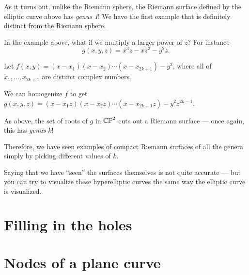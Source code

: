 As it turns out, unlike the Riemann sphere, the Riemann surface defined by the elliptic curve above
has \emph{genus 1}! We have the first example that is definitely distinct from
the Riemann sphere.

\begin{exercise}
	In the example above, what if we multiply a larger power of $z$? For instance
	\[ g(x, y, z) = x^3 z-xz^2-y^2 z. \]
\end{exercise}

\begin{example}
	Let $f(x, y) = (x-x_1)(x-x_2) \dotsm (x-x_{2k+1}) - y^2$, where all of $x_1, \dots, x_{2k+1}$ are
	distinct complex numbers.

	We can homogenize $f$ to get $g(x, y, z) = (x-x_1 z)(x-x_2 z) \dotsm (x-x_{2k+1} z) - y^2
	z^{2k-1}$.

	As above, the set of roots of $g$ in $\mathbb{CP}^2$ cuts out a Riemann surface --- once again, this has
	\emph{genus $k$}!

	Therefore, we have seen examples of compact Riemann surfaces of all the genera simply by picking
	different values of $k$.
\end{example}
Saying that we have ``seen'' the surfaces themselves is not quite accurate ---
but you can try to visualize these hyperelliptic curves the same way the elliptic curve is
visualized.

\section{Filling in the holes}

\section{Nodes of a plane curve}
